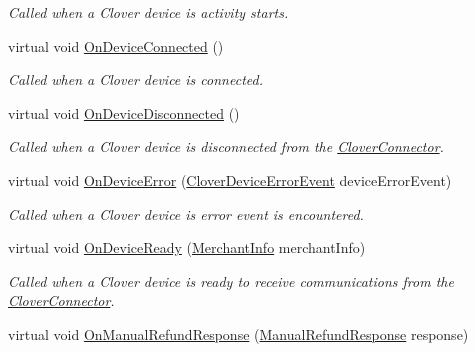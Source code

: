 \begin{DoxyCompactItemize}
\begin{DoxyCompactList}\small\item\em Called when a Clover device is activity starts. \end{DoxyCompactList}\item 
virtual void \hyperlink{classcom_1_1clover_1_1remotepay_1_1sdk_1_1_default_clover_connector_listener_a0cddc2718e6895d057bebd5f3478f105}{On\+Device\+Connected} ()
\begin{DoxyCompactList}\small\item\em Called when a Clover device is connected. \end{DoxyCompactList}\item 
virtual void \hyperlink{classcom_1_1clover_1_1remotepay_1_1sdk_1_1_default_clover_connector_listener_a2768c7875db334d7615cfac32b8a9115}{On\+Device\+Disconnected} ()
\begin{DoxyCompactList}\small\item\em Called when a Clover device is disconnected from the \hyperlink{classcom_1_1clover_1_1remotepay_1_1sdk_1_1_clover_connector}{Clover\+Connector}. \end{DoxyCompactList}\item 
virtual void \hyperlink{classcom_1_1clover_1_1remotepay_1_1sdk_1_1_default_clover_connector_listener_af1b973a12629519c039d2fa64da62606}{On\+Device\+Error} (\hyperlink{classcom_1_1clover_1_1remotepay_1_1sdk_1_1_clover_device_error_event}{Clover\+Device\+Error\+Event} device\+Error\+Event)
\begin{DoxyCompactList}\small\item\em Called when a Clover device is error event is encountered. \end{DoxyCompactList}\item 
virtual void \hyperlink{classcom_1_1clover_1_1remotepay_1_1sdk_1_1_default_clover_connector_listener_add16a6bfe009ef45650f9493425937b7}{On\+Device\+Ready} (\hyperlink{classcom_1_1clover_1_1remotepay_1_1sdk_1_1_merchant_info}{Merchant\+Info} merchant\+Info)
\begin{DoxyCompactList}\small\item\em Called when a Clover device is ready to receive communications from the \hyperlink{classcom_1_1clover_1_1remotepay_1_1sdk_1_1_clover_connector}{Clover\+Connector}. \end{DoxyCompactList}\item 
virtual void \hyperlink{classcom_1_1clover_1_1remotepay_1_1sdk_1_1_default_clover_connector_listener_a8294033c92e3c74aea2aac5e47c72873}{On\+Manual\+Refund\+Response} (\hyperlink{classcom_1_1clover_1_1remotepay_1_1sdk_1_1_manual_refund_response}{Manual\+Refund\+Response} response)

\end{DoxyCompactItemize}
